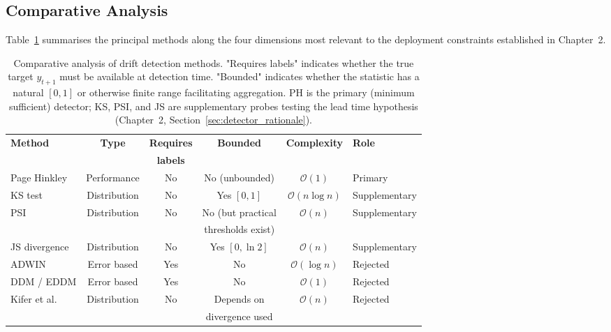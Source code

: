 \subsection{Comparative Analysis}

Table~\ref{tab:detector_comparison} summarises the principal methods along the four dimensions most relevant to the deployment constraints established in Chapter~2.

\begin{table}[htbp]
  \centering
  \caption{Comparative analysis of drift detection methods. "Requires labels"
    indicates whether the true target $y_{t+1}$ must be available at detection time.
    "Bounded" indicates whether the statistic has a natural $[0,1]$ or otherwise
    finite range facilitating aggregation. PH is the primary (minimum sufficient)
    detector; KS, PSI, and JS are supplementary probes testing the lead time
    hypothesis (Chapter~2, Section~\ref{sec:detector_rationale}).}
  \label{tab:detector_comparison}
  \begin{tabular}{lccccl}
    \hline
    \textbf{Method} & \textbf{Type} & \textbf{Requires}
      & \textbf{Bounded} & \textbf{Complexity}
      & \textbf{Role} \\
    & & \textbf{labels} & & & \\
    \hline
    Page Hinkley     & Performance  & No  & No (unbounded)    & $\mathcal{O}(1)$       & Primary \\
    KS test          & Distribution & No  & Yes $[0,1]$       & $\mathcal{O}(n\log n)$ & Supplementary \\
    PSI              & Distribution & No  & No (but practical & $\mathcal{O}(n)$       & Supplementary \\
                     &              &     & thresholds exist) & & \\
    JS divergence    & Distribution & No  & Yes $[0,\ln 2]$   & $\mathcal{O}(n)$       & Supplementary \\
    ADWIN            & Error based  & Yes & No                & $\mathcal{O}(\log n)$  & Rejected \\
    DDM / EDDM       & Error based  & Yes & No                & $\mathcal{O}(1)$       & Rejected \\
    Kifer et al.     & Distribution & No  & Depends on        & $\mathcal{O}(n)$       & Rejected \\
                     &              &     & divergence used   & & \\
    \hline
  \end{tabular}
\end{table}

